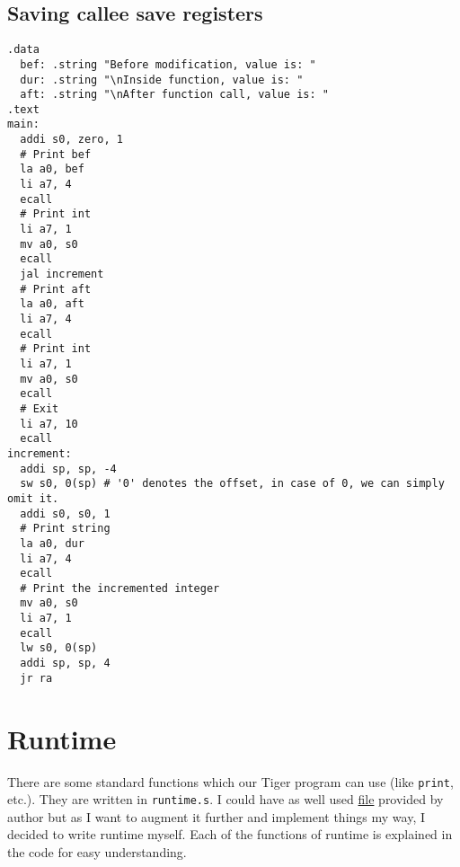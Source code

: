 \subsection{Saving callee save registers}
\begin{verbatim}
.data
  bef: .string "Before modification, value is: "
  dur: .string "\nInside function, value is: "
  aft: .string "\nAfter function call, value is: "
.text 
main:
  addi s0, zero, 1
  # Print bef
  la a0, bef
  li a7, 4
  ecall
  # Print int
  li a7, 1
  mv a0, s0
  ecall
  jal increment
  # Print aft
  la a0, aft
  li a7, 4
  ecall
  # Print int
  li a7, 1
  mv a0, s0
  ecall
  # Exit
  li a7, 10
  ecall
increment:
  addi sp, sp, -4
  sw s0, 0(sp) # '0' denotes the offset, in case of 0, we can simply omit it.
  addi s0, s0, 1
  # Print string
  la a0, dur
  li a7, 4
  ecall
  # Print the incremented integer
  mv a0, s0
  li a7, 1
  ecall
  lw s0, 0(sp)
  addi sp, sp, 4
  jr ra
\end{verbatim}

\section{Runtime}


There are some standard functions which our Tiger program can use (like \texttt{print}, etc.). They are written in \texttt{runtime.s}. I could have as well used \href{https://www.cs.princeton.edu/~appel/modern/spim/runtime.s}{file} provided by author but as I want to augment it further and implement things my way, I decided to write runtime myself. Each of the functions of runtime is explained in the code for easy understanding.
